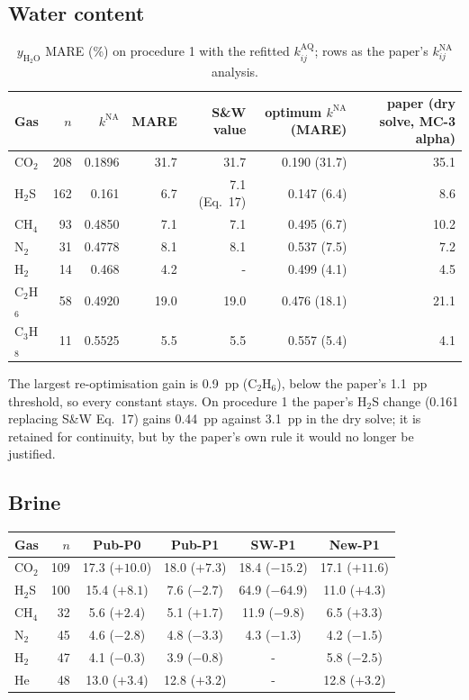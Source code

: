 \documentclass[10pt,a4paper]{article}
\begin{document}
\subsection{Water content}
\begin{table}[h]\centering\small
\caption{$y_{\mathrm{H_2O}}$ MARE (\%) on procedure 1 with the refitted $k_{ij}^{\mathrm{AQ}}$; rows as the paper's $k_{ij}^{\mathrm{NA}}$ analysis.}\label{tab:kna}
\begin{tabular}{lrrrrrr}
\toprule
Gas & $n$ & $k^{\mathrm{NA}}$ & MARE & S\&W value & optimum $k^{\mathrm{NA}}$ (MARE) & paper (dry solve, MC-3 alpha) \\
\midrule
CO$_2$ & 208 & 0.1896 & 31.7 & 31.7 & 0.190 (31.7) & 35.1 \\
H$_2$S & 162 & 0.161 & 6.7 & 7.1 (Eq.~17) & 0.147 (6.4) & 8.6 \\
CH$_4$ & 93 & 0.4850 & 7.1 & 7.1 & 0.495 (6.7) & 10.2 \\
N$_2$ & 31 & 0.4778 & 8.1 & 8.1 & 0.537 (7.5) & 7.2 \\
H$_2$ & 14 & 0.468 & 4.2 & - & 0.499 (4.1) & 4.5 \\
C$_2$H$_6$ & 58 & 0.4920 & 19.0 & 19.0 & 0.476 (18.1) & 21.1 \\
C$_3$H$_8$ & 11 & 0.5525 & 5.5 & 5.5 & 0.557 (5.4) & 4.1 \\
\bottomrule
\end{tabular}
\end{table}
The largest re-optimisation gain is 0.9~pp (C$_2$H$_6$), below the paper's 1.1~pp threshold, so every constant stays. On procedure 1 the paper's H$_2$S change (0.161 replacing S\&W Eq.~17) gains 0.44~pp against 3.1~pp in the dry solve; it is retained for continuity, but by the paper's own rule it would no longer be justified.

\subsection{Brine}\label{sec:brine}
\begin{center}\small
\begin{tabular}{lrcccc}
\toprule
Gas & $n$ & Pub-P0 & Pub-P1 & SW-P1 & New-P1 \\
\midrule
CO$_2$ & 109 & 17.3 ($+10.0$) & 18.0 ($+7.3$) & 18.4 ($-15.2$) & 17.1 ($+11.6$) \\
H$_2$S & 100 & 15.4 ($+8.1$) & 7.6 ($-2.7$) & 64.9 ($-64.9$) & 11.0 ($+4.3$) \\
CH$_4$ & 32 & 5.6 ($+2.4$) & 5.1 ($+1.7$) & 11.9 ($-9.8$) & 6.5 ($+3.3$) \\
N$_2$ & 45 & 4.6 ($-2.8$) & 4.8 ($-3.3$) & 4.3 ($-1.3$) & 4.2 ($-1.5$) \\
H$_2$ & 47 & 4.1 ($-0.3$) & 3.9 ($-0.8$) & - & 5.8 ($-2.5$) \\
He & 48 & 13.0 ($+3.4$) & 12.8 ($+3.2$) & - & 12.8 ($+3.2$) \\
\bottomrule
\end{tabular}
\end{center}
\end{document}
